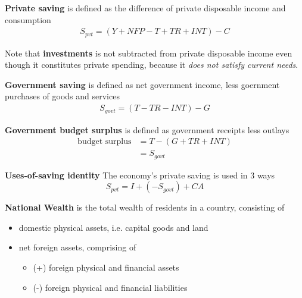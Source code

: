 \documentclass[letterpaper, 9pt,landscape]{extarticle}
\begin{document}
\begin{multicols*}{5}
\begin{definition}
    \textbf{Private saving} is defined as the difference of private disposable income and consumption 
    \begin{align*}
        S_{pvt} = (Y + NFP - T + TR + INT) - C
    \end{align*}
\end{definition}


\begin{remark}
    Note that \textbf{investments} is not subtracted from private disposable income even though it constitutes private spending, because it \textit{does not satisfy current needs}.
\end{remark}

\begin{definition}
    \textbf{Government saving} is defined as net government income, less goernment purchases of goods and services 
    \begin{align*}
        S_{govt} = (T - TR - INT) - G
    \end{align*}
\end{definition}

\begin{remark}
    \textbf{Government budget surplus} is defined as government receipts less outlays 
    \begin{align*}
        \text{budget surplus} &= T - (G + TR + INT) \\
        &= S_{govt}
    \end{align*}
\end{remark}

\begin{theorem}
    \textbf{Uses-of-saving identity} The economy's private saving is used in 3 ways 
    \[
        S_{pvt} = I + (- S_{govt}) + CA
    \]
\end{theorem}

\begin{definition}
    \textbf{National Wealth} is the total wealth of residents in a country, consisting of 
    \begin{itemize}
        \item domestic physical assets, i.e. capital goods and land
        \item net foreign assets, comprising of 
        \begin{itemize}
            \item (+) foreign physical and financial assets 
            \item (-) foreign physical and financial liabilities 
        \end{itemize} 
    \end{itemize} 
\end{definition}



\end{multicols*}
\end{document}

